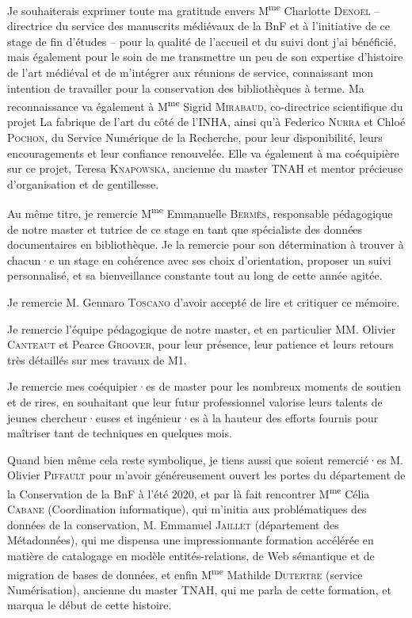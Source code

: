 \documentclass[a4paper,12pt, twoside]{book}
\begin{document}
Je souhaiterais exprimer toute ma gratitude envers M\textsuperscript{me} Charlotte \textsc{Denoël} – directrice du service des manuscrits médiévaux de la BnF et à l’initiative de ce stage de fin d’études – pour la qualité de l’accueil et du suivi dont j’ai bénéficié, mais également pour le soin de me transmettre un peu de son expertise d’histoire de l’art médiéval et de m’intégrer aux réunions de service, connaissant mon intention de travailler pour la conservation des bibliothèques à terme. Ma reconnaissance va également à M\textsuperscript{me} Sigrid \textsc{Mirabaud}, co-directrice scientifique du projet La fabrique de l’art du côté de l’INHA, ainsi qu’à Federico \textsc{Nurra} et Chloé \textsc{Pochon}, du Service Numérique de la Recherche, pour leur disponibilité, leurs encouragements et leur confiance renouvelée. Elle va également à ma coéquipière sur ce projet, Teresa \textsc{Knapowska}, ancienne du master TNAH et mentor précieuse d’organisation et de gentillesse.

Au même titre, je remercie M\textsuperscript{me} Emmanuelle \textsc{Bermès}, responsable pédagogique de notre master et tutrice de ce stage en tant que spécialiste des données documentaires en bibliothèque. Je la remercie pour son détermination à trouver à chacun·e un stage en cohérence avec ses choix d’orientation, proposer un suivi personnalisé, et sa bienveillance constante tout au long de cette année agitée.

Je remercie M. Gennaro \textsc{Toscano} d’avoir accepté de lire et critiquer ce mémoire.

Je remercie l’équipe pédagogique de notre master, et en particulier MM. Olivier \textsc{Canteaut} et Pearce \textsc{Groover}, pour leur présence, leur patience et leurs retours très détaillés sur mes travaux de M1.

Je remercie mes coéquipier·es de master pour les nombreux moments de soutien et de rires, en souhaitant que leur futur professionnel valorise leurs talents de jeunes chercheur·euses et ingénieur·es à la hauteur des efforts fournis pour maîtriser tant de techniques en quelques mois.

Quand bien même cela reste symbolique, je tiens aussi que soient remercié·es M. Olivier \textsc{Piffault} pour m’avoir généreusement ouvert les portes du département de la Conservation de la BnF à l’été 2020, et par là fait rencontrer M\textsuperscript{me} Célia \textsc{Cabane} (Coordination informatique), qui m’initia aux problématiques des données de la conservation, M. Emmanuel \textsc{Jaillet} (département des Métadonnées), qui me dispensa une impressionnante formation accélérée en matière de catalogage en modèle entités-relations, de Web sémantique et de migration de bases de données, et enfin M\textsuperscript{me} Mathilde \textsc{Dutertre} (service Numérisation), ancienne du master TNAH, qui me parla de cette formation, et marqua le début de cette histoire.
\end{document}
